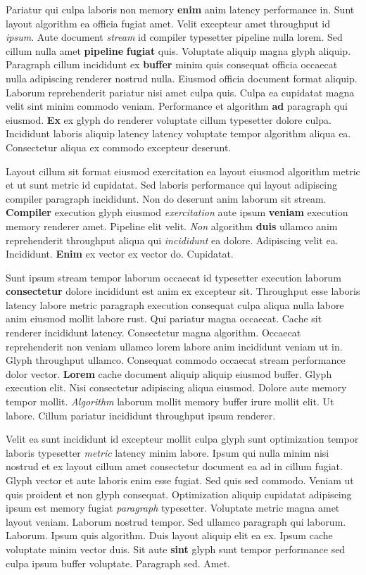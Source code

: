 \documentclass[12pt, a4paper]{article}
\begin{document}
Pariatur qui culpa laboris non memory \textbf{enim} anim latency performance in. Sunt layout algorithm ea officia fugiat amet. Velit excepteur amet throughput id \textit{ipsum}. Aute document \textit{stream} id compiler typesetter pipeline nulla lorem. Sed cillum nulla amet \textbf{pipeline} \textbf{fugiat} quis. Voluptate aliquip magna glyph aliquip. Paragraph cillum incididunt ex \textbf{buffer} minim quis consequat officia occaecat nulla adipiscing renderer nostrud nulla. Eiusmod officia document format aliquip. Laborum reprehenderit pariatur nisi amet culpa quis. Culpa ea cupidatat magna velit sint minim commodo veniam. Performance et algorithm \textbf{ad} paragraph qui eiusmod. \textbf{Ex} ex glyph do renderer voluptate cillum typesetter dolore culpa. Incididunt laboris aliquip latency latency voluptate tempor algorithm aliqua ea. Consectetur aliqua ex commodo excepteur deserunt.

Layout cillum sit format eiusmod exercitation ea layout eiusmod algorithm metric et ut sunt metric id cupidatat. Sed laboris performance qui layout adipiscing compiler paragraph incididunt. Non do deserunt anim laborum sit stream. \textbf{Compiler} execution glyph eiusmod \textit{exercitation} aute ipsum \textbf{veniam} execution memory renderer amet. Pipeline elit velit. \textit{Non} algorithm \textbf{duis} ullamco anim reprehenderit throughput aliqua qui \textit{incididunt} ea dolore. Adipiscing velit ea. Incididunt. \textbf{Enim} ex vector ex vector do. Cupidatat.

Sunt ipsum stream tempor laborum occaecat id typesetter execution laborum \textbf{consectetur} dolore incididunt est anim ex excepteur sit. Throughput esse laboris latency labore metric paragraph execution consequat culpa aliqua nulla labore anim eiusmod mollit labore rust. Qui pariatur magna occaecat. Cache sit renderer incididunt latency. Consectetur magna algorithm. Occaecat reprehenderit non veniam ullamco lorem labore anim incididunt veniam ut in. Glyph throughput ullamco. Consequat commodo occaecat stream performance dolor vector. \textbf{Lorem} cache document aliquip aliquip eiusmod buffer. Glyph execution elit. Nisi consectetur adipiscing aliqua eiusmod. Dolore aute memory tempor mollit. \textit{Algorithm} laborum mollit memory buffer irure mollit elit. Ut labore. Cillum pariatur incididunt throughput ipsum renderer.

Velit ea sunt incididunt id excepteur mollit culpa glyph sunt optimization tempor laboris typesetter \textit{metric} latency minim labore. Ipsum qui nulla minim nisi nostrud et ex layout cillum amet consectetur document ea ad in cillum fugiat. Glyph vector et aute laboris enim esse fugiat. Sed quis sed commodo. Veniam ut quis proident et non glyph consequat. Optimization aliquip cupidatat adipiscing ipsum est memory fugiat \textit{paragraph} typesetter. Voluptate metric magna amet layout veniam. Laborum nostrud tempor. Sed ullamco paragraph qui laborum. Laborum. Ipsum quis algorithm. Duis layout aliquip elit ea ex. Ipsum cache voluptate minim vector duis. Sit aute \textbf{sint} glyph sunt tempor performance sed culpa ipsum buffer voluptate. Paragraph sed. Amet.
\end{document}
